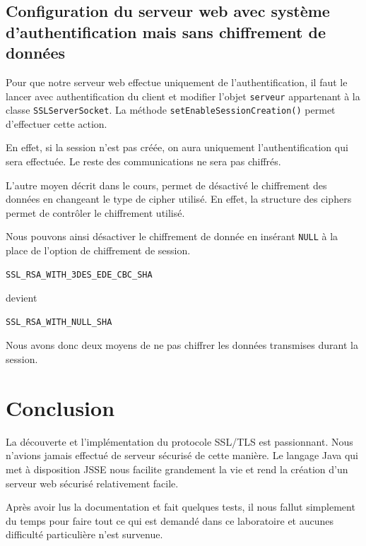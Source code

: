 \documentclass[10pt,a4paper,titlepage]{article}
\begin{document}
\subsection{Configuration du serveur web avec système d'authentification mais sans chiffrement de données}

Pour que notre serveur web effectue uniquement de l'authentification, il faut le lancer avec authentification du client et modifier l'objet \texttt{serveur} appartenant à la classe \texttt{SSLServerSocket}. La méthode \texttt{setEnableSessionCreation()} permet d'effectuer cette action.

En effet, si la session n'est pas créée, on aura uniquement l'authentification qui sera effectuée. Le reste des communications ne sera pas chiffrés.

L'autre moyen décrit dans le cours, permet de désactivé le chiffrement des données en changeant le type de cipher utilisé. En effet, la structure des ciphers permet de contrôler le chiffrement utilisé.

Nous pouvons ainsi désactiver le chiffrement de donnée en insérant \texttt{NULL} à la place de l'option de chiffrement de session.

\begin{lstlisting}
SSL_RSA_WITH_3DES_EDE_CBC_SHA
\end{lstlisting}

devient

\begin{lstlisting}
SSL_RSA_WITH_NULL_SHA
\end{lstlisting}

Nous avons donc deux moyens de ne pas chiffrer les données transmises durant la session. 

\section{Conclusion}

La découverte et l'implémentation du protocole SSL/TLS est passionnant. Nous n'avions jamais effectué de serveur sécurisé de cette manière. Le langage Java qui met à disposition JSSE nous facilite grandement la vie et rend la création d'un serveur web sécurisé relativement facile. 

Après avoir lus la documentation et fait quelques tests, il nous fallut simplement du temps pour faire tout ce qui est demandé dans ce laboratoire et aucunes difficulté particulière n'est survenue.
\end{document}
